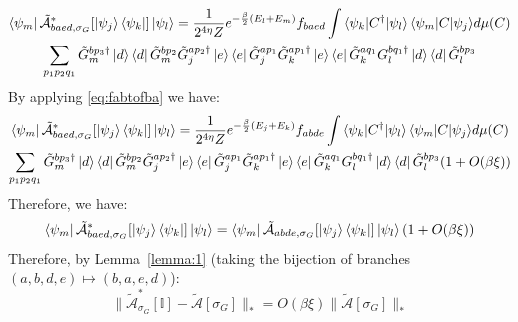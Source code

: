 \documentclass[aps,floatfix,10pt,amssymb,amsfont,amsmath,superscriptaddress,float,nofootinbib,longbibliography,nobalancelastpage,twocolumn]{revtex4-2}
\begin{document}
\begin{widetext}
\begin{multline}
   \bra{\psi_m}\tilde{\mathcal{A}}^*_{baed,\sigma_G}[\ket{\psi_j}\bra{\psi_k}]\ket{\psi_l}  =\frac{1}{2^{4\eta}Z}  e^{-\frac{\beta}{2}(E_l+E_m)}{f_{baed}}  \int {\braket{\psi_k|C^{\dagger}|\psi_l}\braket{\psi_m|C|\psi_j}} d\mu(C)\\\sum_{p_1p_2q_1} \tilde G_m^{bp_3\dagger} \ket{d}\bra{d}\tilde G_m^{bp_2} {\tilde G^{ap_2\dagger}_j\ket{e}\bra{e}\tilde G^{ap_1}_j } {\tilde G^{ap_1\dagger}_k\ket{e}\bra{e}\tilde G^{aq_1}_k} G_l^{bq_1\dagger}\ket{d}\bra{d}\tilde G_l^{bp_3} 
\end{multline}
By applying \eqref{eq:fabtofba} we have:
\begin{multline}
   \bra{\psi_m}\tilde{\mathcal{A}}^*_{baed,\sigma_G}[\ket{\psi_j}\bra{\psi_k}]\ket{\psi_l}  =\frac{1}{2^{4\eta}Z} e^{-\frac{\beta}{2}(E_j+E_k)}{f_{abde}} \int {\braket{\psi_k|C^{\dagger}|\psi_l}\braket{\psi_m|C|\psi_j}} d\mu(C)\\\sum_{p_1p_2q_1} \tilde G_m^{bp_3\dagger} \ket{d}\bra{d}\tilde G_m^{bp_2} {\tilde G^{ap_2\dagger}_j\ket{e}\bra{e}\tilde G^{ap_1}_j } {\tilde G^{ap_1\dagger}_k\ket{e}\bra{e}\tilde G^{aq_1}_k} G_l^{bq_1\dagger}\ket{d}\bra{d}\tilde G_l^{bp_3} (1+O(\beta \xi))
\end{multline}
Therefore, we have:
\begin{equation}
   \bra{\psi_m}\tilde{\mathcal{A}}^*_{baed,\sigma_G}[\ket{\psi_j}\bra{\psi_k}]\ket{\psi_l} = \bra{\psi_m}\tilde{\mathcal{A}}_{abde,\sigma_G}[\ket{\psi_j}\bra{\psi_k}]\ket{\psi_l} (1+O(\beta \xi))
\end{equation} Therefore, by Lemma~\ref{lemma:1} (taking the bijection of branches $(a,b,d,e) \mapsto (b,a,e,d)$):
\begin{equation}
    \|\tilde{\mathcal{A}}^*_{\sigma_G}[\mathbb{I}] - \tilde{\mathcal{A}}[\sigma_G]\|_* = O(\beta \xi)\|\tilde{\mathcal{A}}[\sigma_G]\|_*
    \label{eq:Aoutput}
\end{equation}


\end{widetext}
\end{document}
